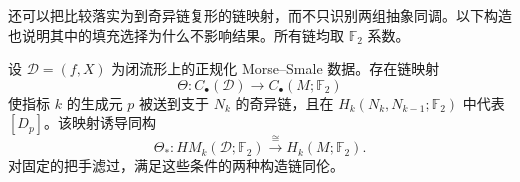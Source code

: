 还可以把比较落实为到奇异链复形的链映射，而不只识别两组抽象同调。以下构造也说明其中的填充选择为什么不影响结果。所有链均取 \(\mathbb F_2\) 系数。

\begin{theorem}\label{g2:thm:morse-singular-comparison}
	设 \(\mathcal D=(f,X)\) 为闭流形上的正规化 Morse--Smale 数据。存在链映射
	\[
		\Theta:C_\bullet(\mathcal D)\longrightarrow C_\bullet(M;\mathbb F_2)
	\]
	使指标 \(k\) 的生成元 \(p\) 被送到支于 \(N_k\) 的奇异链，且在 \(H_k(N_k,N_{k-1};\mathbb F_2)\) 中代表 \([D_p]\)。该映射诱导同构
	\begin{equation}\label{g2:eq:morse-singular-isomorphism}
		\Theta_*:HM_k(\mathcal D;\mathbb F_2)\xrightarrow{\ \cong\ }H_k(M;\mathbb F_2).
	\end{equation}
	对固定的把手滤过，满足这些条件的两种构造链同伦。
\end{theorem}

